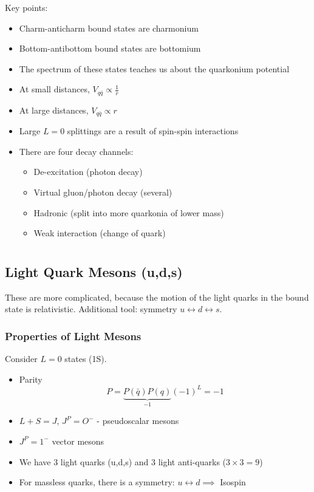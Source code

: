\documentclass[a4paper, 11pt, normalem]{report}
\begin{document}
Key points:
\begin{itemize}
    \item Charm-anticharm bound states are charmonium
    \item Bottom-antibottom bound states are bottomium
    \item The spectrum of these states teaches us about the quarkonium potential
    \item At small distances, $V_{q\bar{q}} \propto \frac{1}{r}$
    \item At large distances, $V_{q\bar{q}} \propto r$
    \item Large $L=0$ splittings are a result of spin-spin interactions
    \item There are four decay channels:
        \begin{itemize}
            \item De-excitation (photon decay)
            \item Virtual gluon/photon decay (several)
            \item Hadronic (split into more quarkonia of lower mass)
            \item Weak interaction (change of quark)
        \end{itemize}
\end{itemize}

\chapter{}
\section{Light Quark Mesons (u,d,s)}
These are more complicated, because the motion of the light quarks in the bound state is relativistic. 
Additional tool: symmetry $u \leftrightarrow d \leftrightarrow s$.

\subsection{Properties of Light Mesons}
Consider $L=0$ states (1S).
\begin{itemize}
    \item Parity
        \begin{equation}
            P = \underbrace{P(\bar{q})P(q)}_{-1}(-1)^L = -1
        \end{equation}
    \item $L + S = J$, $J^P = O^-$ - pseudoscalar mesons
    \item $J^P = 1^-$ vector mesons
    \item We have 3 light quarks (u,d,s) and 3 light anti-quarks ($3\times3=9$)
    \item For massless quarks, there is a symmetry: $u \leftrightarrow d \implies$ Isospin
\end{itemize}
\end{document}
